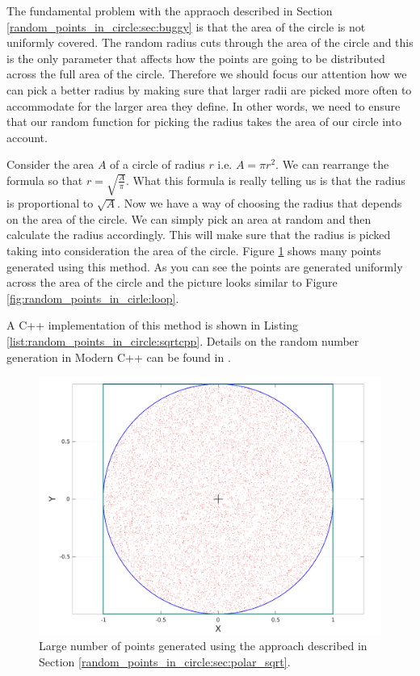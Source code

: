 The fundamental problem with the appraoch described in Section \ref{random_points_in_circle:sec:buggy} is that the area of the circle is not uniformly covered. The random radius cuts through the area of the circle and this is the only parameter that affects how the points are going to be distributed across the full area of the circle. Therefore we should focus our attention how we can pick a better radius by making sure that larger radii are picked more often to accommodate for the larger area they define. In other words, we need to ensure that our random function for picking the radius takes the area of our circle into account.

Consider the area $A$ of a circle of radius $r$ i.e.  $A = \pi r^2$. We can rearrange the formula so that $r = \sqrt{\frac{A}{\pi}}$. What this formula is really telling us is that the radius is proportional to $\sqrt{A}$. Now we have a way of choosing the radius that depends on the area of the circle. We can simply pick an area at random and then calculate the radius accordingly. This will make sure that the radius is picked taking into consideration the area of the circle. Figure \ref{fig:random_points_in_cirle:polar_sqrt} shows many points generated using this method. As you can see the points are generated uniformly across the area of the circle and the picture looks similar to Figure \ref{fig:random_points_in_cirle:loop}.

A C++ implementation of this method is shown in Listing \ref{list:random_points_in_circle:sqrtcpp}. Details on the random number generation in Modern C++ can be found in \cite{cit::std::random}.



\begin{figure}
	\label{fig:random_points_in_cirle:polar_sqrt}
	\centering
	\includegraphics[scale=0.3]{sources/random_points_in_circle/images/sqrt_points}
	\caption{Large number of points generated using the approach described in Section \ref{random_points_in_circle:sec:polar_sqrt}.}
\end{figure}

